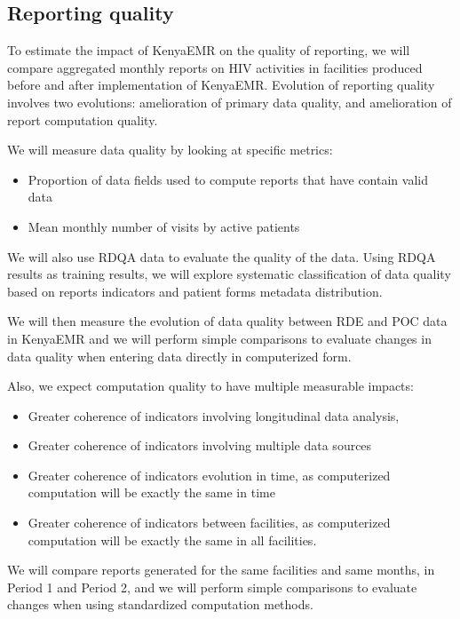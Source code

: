 \subsection{Reporting quality}
\label{sec:rep_quality}
To estimate the impact of KenyaEMR on the quality of reporting, we will compare aggregated monthly reports on HIV activities in facilities produced before and after implementation of KenyaEMR. Evolution of reporting quality involves two evolutions: amelioration of primary data quality, and amelioration of report computation quality.



We will measure data quality by looking at specific metrics:
\begin{itemize}
	\item	Proportion of data fields used to compute reports that have contain valid data
	\item	Mean monthly number of visits by active patients
\end{itemize}

We will also use RDQA data to evaluate the quality of the data. Using RDQA results as training results, we will explore systematic classification of data quality based on reports indicators and patient forms metadata distribution.

We will then measure the evolution of data quality between RDE and POC data in KenyaEMR and we will perform simple comparisons to evaluate changes in data quality when entering data directly in computerized form.

Also, we expect computation quality to have multiple measurable impacts:
\begin{itemize}
	\item	Greater coherence of indicators involving longitudinal data analysis,
	\item	Greater coherence of indicators involving multiple data sources
	\item	Greater coherence of indicators evolution in time, as computerized computation will be exactly the same in time
	\item	Greater coherence of indicators between facilities, as computerized computation will be exactly the same in all facilities.
\end{itemize}

We will compare reports generated for the same facilities and same months, in Period 1 and Period 2, and we will perform simple comparisons to evaluate changes when using standardized computation methods.

